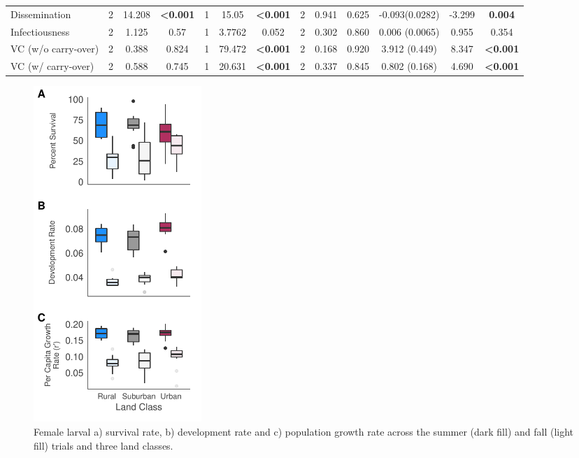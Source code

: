 \documentclass[12pt]{article}
\begin{document}
\begin{landscape}
\begin{table}[]
\begin{tabular}{l|ccc|ccc|ccc|ccc}
Dissemination               & 2           & 14.208    & \textbf{\textless0.001} & 1           & 15.05     & \textbf{\textless0.001} & 2           & 0.941     & 0.625                   & -0.093(0.0282)   & -3.299  & \textbf{0.004}          \\
Infectiousness              & 2           & 1.125     & 0.57                    & 1           & 3.7762    & 0.052                   & 2           & 0.302     & 0.860                   & 0.006 (0.0065)   & 0.955   & 0.354                   \\
VC (w/o carry-over)         & 2           & 0.388     & 0.824                   & 1           & 79.472    & \textbf{\textless0.001} & 2           & 0.168     & 0.920                   & 3.912 (0.449)    & 8.347   & \textbf{\textless0.001} \\
VC (w/ carry-over)          & 2           & 0.588     & 0.745                   & 1           & 20.631    & \textbf{\textless0.001} & 2           & 0.337     & 0.845                   & 0.802 (0.168)    & 4.690   & \textbf{\textless0.001} \\
\end{tabular}
\end{table}

\end{landscape}

\begin{figure}
\centering\includegraphics[height=5in, keepaspectratio]{Fig1.pdf}
\caption{Female larval a) survival rate, b) development rate and c) population growth rate across the summer (dark fill) and fall (light fill) trials and three land classes.}
\label{fig:growth}
\end{figure}
\end{document}
